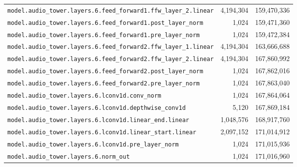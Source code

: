 \documentclass[10pt,a4paper]{article}
\theoremstyle{definition}
\begin{document}
\begin{appendices}
\begin{longtable}{p{9.5cm}rr}
\texttt{model.\allowbreak{}audio\_tower.\allowbreak{}layers.\allowbreak{}6.\allowbreak{}feed\_forward1.\allowbreak{}ffw\_layer\_2.\allowbreak{}linear} & 4,194,304 & 159,470,336 \\
\texttt{model.\allowbreak{}audio\_tower.\allowbreak{}layers.\allowbreak{}6.\allowbreak{}feed\_forward1.\allowbreak{}post\_layer\_norm} & 1,024 & 159,471,360 \\
\texttt{model.\allowbreak{}audio\_tower.\allowbreak{}layers.\allowbreak{}6.\allowbreak{}feed\_forward1.\allowbreak{}pre\_layer\_norm} & 1,024 & 159,472,384 \\
\texttt{model.\allowbreak{}audio\_tower.\allowbreak{}layers.\allowbreak{}6.\allowbreak{}feed\_forward2.\allowbreak{}ffw\_layer\_1.\allowbreak{}linear} & 4,194,304 & 163,666,688 \\
\texttt{model.\allowbreak{}audio\_tower.\allowbreak{}layers.\allowbreak{}6.\allowbreak{}feed\_forward2.\allowbreak{}ffw\_layer\_2.\allowbreak{}linear} & 4,194,304 & 167,860,992 \\
\texttt{model.\allowbreak{}audio\_tower.\allowbreak{}layers.\allowbreak{}6.\allowbreak{}feed\_forward2.\allowbreak{}post\_layer\_norm} & 1,024 & 167,862,016 \\
\texttt{model.\allowbreak{}audio\_tower.\allowbreak{}layers.\allowbreak{}6.\allowbreak{}feed\_forward2.\allowbreak{}pre\_layer\_norm} & 1,024 & 167,863,040 \\
\texttt{model.\allowbreak{}audio\_tower.\allowbreak{}layers.\allowbreak{}6.\allowbreak{}lconv1d.\allowbreak{}conv\_norm} & 1,024 & 167,864,064 \\
\texttt{model.\allowbreak{}audio\_tower.\allowbreak{}layers.\allowbreak{}6.\allowbreak{}lconv1d.\allowbreak{}depthwise\_conv1d} & 5,120 & 167,869,184 \\
\texttt{model.\allowbreak{}audio\_tower.\allowbreak{}layers.\allowbreak{}6.\allowbreak{}lconv1d.\allowbreak{}linear\_end.\allowbreak{}linear} & 1,048,576 & 168,917,760 \\
\texttt{model.\allowbreak{}audio\_tower.\allowbreak{}layers.\allowbreak{}6.\allowbreak{}lconv1d.\allowbreak{}linear\_start.\allowbreak{}linear} & 2,097,152 & 171,014,912 \\
\texttt{model.\allowbreak{}audio\_tower.\allowbreak{}layers.\allowbreak{}6.\allowbreak{}lconv1d.\allowbreak{}pre\_layer\_norm} & 1,024 & 171,015,936 \\
\texttt{model.\allowbreak{}audio\_tower.\allowbreak{}layers.\allowbreak{}6.\allowbreak{}norm\_out} & 1,024 & 171,016,960 \\

\end{longtable}
\end{appendices}
\end{document}

